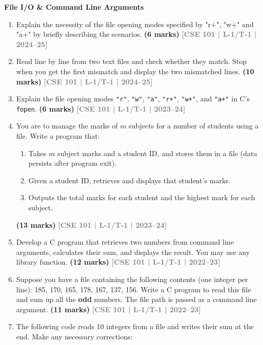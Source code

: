 \documentclass[12pt,a3paper]{article}
\newcommand{\yr}[1]{\hfill\textcolor{gray}{\small\textbf{[#1]}}}
\newcommand{\mk}[1]{\textcolor{orange!70!black}{\small\textbf{(#1 marks)}}}
\newcommand{\subtopic}[2]{%
  \vspace{10pt}
  \noindent\begin{tcolorbox}[colback=#1!8,colframe=#1,boxrule=0.6pt,arc=4pt,
    left=6pt,right=6pt,top=4pt,bottom=4pt]
    \small\bfseries\textcolor{#1}{#2}
  \end{tcolorbox}
  \vspace{2pt}
}
\begin{document}
\subtopic{cD}{File I/O \& Command Line Arguments}
\label{sub:s7-fileio}

\begin{enumerate}


\item Explain the necessity of the file opening modes specified by "r+", "w+" and "a+" by briefly describing the scenarios.
\mk{6} \yr{CSE 101 | L-1/T-1 | 2024--25}

\item Read line by line from two text files and check whether they match. Stop when you get the first mismatch and display the two mismatched lines.
\mk{10} \yr{CSE 101 | L-1/T-1 | 2024--25}


\item Explain the file opening modes \texttt{"r"}, \texttt{"w"}, \texttt{"a"}, \texttt{"r+"}, \texttt{"w+"}, and \texttt{"a+"} in C's \texttt{fopen}.
\mk{6} \yr{CSE 101 | L-1/T-1 | 2023--24}

\item You are to manage the marks of $m$ subjects for a number of students using a file. Write a program that:
\begin{enumerate}
  \item Takes $m$ subject marks and a student ID, and stores them in a file (data persists after program exit).
  \item Given a student ID, retrieves and displays that student's marks.
  \item Outputs the total marks for each student and the highest mark for each subject.
\end{enumerate}
\mk{13} \yr{CSE 101 | L-1/T-1 | 2023--24}

\item Develop a C program that retrieves two numbers from command line arguments, calculates their sum, and displays the result. You may use any library function.
\mk{12} \yr{CSE 101 | L-1/T-1 | 2022--23}

\item Suppose you have a file containing the following contents (one integer per line): 185, 170, 165, 178, 167, 137, 156. Write a C program to read this file and sum up all the \textbf{odd} numbers. The file path is passed as a command line argument.
\mk{11} \yr{CSE 101 | L-1/T-1 | 2022--23}

\item The following code reads 10 integers from a file and writes their sum at the end. Make any necessary corrections:
 

\end{enumerate}
\end{document}
